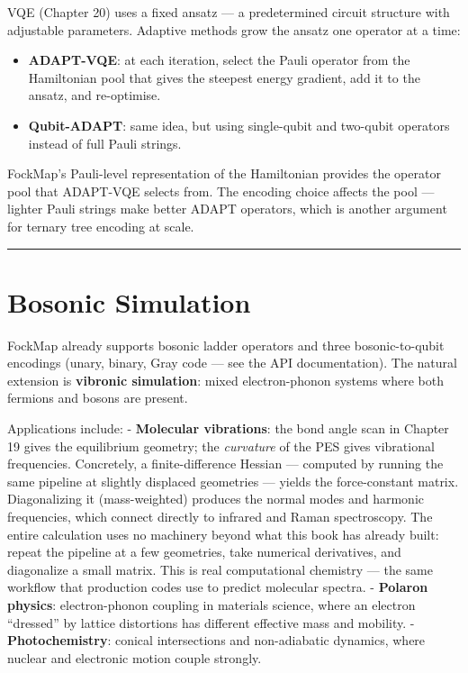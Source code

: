 \documentclass[
  11pt,
  oneside]{book}
\providecommand{\tightlist}{%
  \setlength{\itemsep}{0pt}\setlength{\parskip}{0pt}}
\begin{document}
VQE (Chapter 20) uses a fixed ansatz --- a predetermined circuit
structure with adjustable parameters. Adaptive methods grow the ansatz
one operator at a time:

\begin{itemize}
\tightlist
\item
  \textbf{ADAPT-VQE}: at each iteration, select the Pauli operator from
  the Hamiltonian pool that gives the steepest energy gradient, add it
  to the ansatz, and re-optimise.
\item
  \textbf{Qubit-ADAPT}: same idea, but using single-qubit and two-qubit
  operators instead of full Pauli strings.
\end{itemize}

FockMap's Pauli-level representation of the Hamiltonian provides the
operator pool that ADAPT-VQE selects from. The encoding choice affects
the pool --- lighter Pauli strings make better ADAPT operators, which is
another argument for ternary tree encoding at scale.

\begin{center}\rule{0.5\linewidth}{0.5pt}\end{center}

\section{Bosonic Simulation}\label{bosonic-simulation}

FockMap already supports bosonic ladder operators and three
bosonic-to-qubit encodings (unary, binary, Gray code --- see the API
documentation). The natural extension is \textbf{vibronic simulation}:
mixed electron-phonon systems where both fermions and bosons are
present.

Applications include: - \textbf{Molecular vibrations}: the bond angle
scan in Chapter 19 gives the equilibrium geometry; the \emph{curvature}
of the PES gives vibrational frequencies. Concretely, a
finite-difference Hessian --- computed by running the same pipeline at
slightly displaced geometries --- yields the force-constant matrix.
Diagonalizing it (mass-weighted) produces the normal modes and harmonic
frequencies, which connect directly to infrared and Raman spectroscopy.
The entire calculation uses no machinery beyond what this book has
already built: repeat the pipeline at a few geometries, take numerical
derivatives, and diagonalize a small matrix. This is real computational
chemistry --- the same workflow that production codes use to predict
molecular spectra. - \textbf{Polaron physics}: electron-phonon coupling
in materials science, where an electron ``dressed'' by lattice
distortions has different effective mass and mobility. -
\textbf{Photochemistry}: conical intersections and non-adiabatic
dynamics, where nuclear and electronic motion couple strongly.
\end{document}
